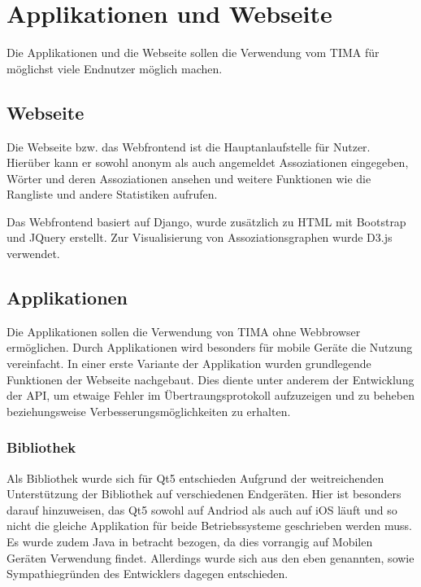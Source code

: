 \chapter{Applikationen und Webseite}
Die Applikationen und die Webseite sollen die Verwendung vom TIMA für möglichst
viele Endnutzer möglich machen.

\section{Webseite}
Die Webseite bzw. das Webfrontend ist die Hauptanlaufstelle für Nutzer. Hierüber kann er sowohl anonym als auch angemeldet Assoziationen eingegeben, Wörter und
deren Assoziationen ansehen und weitere Funktionen wie die Rangliste und andere Statistiken aufrufen.

Das Webfrontend basiert auf Django, wurde zusätzlich zu HTML mit Bootstrap und JQuery erstellt. Zur Visualisierung von Assoziationsgraphen wurde D3.js verwendet.

\section{Applikationen}
Die Applikationen sollen die Verwendung von TIMA ohne Webbrowser ermöglichen. Durch Applikationen wird besonders für mobile Geräte die Nutzung vereinfacht.
In einer erste Variante der Applikation wurden grundlegende Funktionen der
Webseite nachgebaut. Dies diente unter anderem der Entwicklung der API, um etwaige
Fehler im Übertraungsprotokoll aufzuzeigen und zu beheben beziehungsweise Verbesserungsmöglichkeiten zu erhalten.

\subsection{Bibliothek}
Als Bibliothek wurde sich für Qt5 entschieden Aufgrund der weitreichenden
Unterstützung der Bibliothek auf verschiedenen Endgeräten. Hier ist besonders darauf hinzuweisen, das Qt5 sowohl auf Andriod als auch auf iOS läuft und so nicht die gleiche Applikation für beide Betriebssysteme geschrieben werden muss.
Es wurde zudem Java in betracht bezogen, da dies vorrangig auf Mobilen Geräten
Verwendung findet. Allerdings wurde sich aus den eben genannten, sowie Sympathiegründen des Entwicklers
dagegen entschieden.

